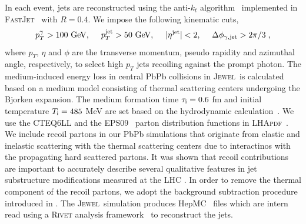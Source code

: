 \documentclass[notoc]{JHEP3}
\newcommand{\text}[1]{{\rm #1}}
\newcommand{\jw}{\textsc{Jewel}~}
\begin{document}
In each event, jets are reconstructed using the anti-$k_{t}$ algorithm~\cite{Cacciari:2008gp} implemented in \textsc{FastJet}~\cite{Cacciari:2011ma} with $R = 0.4$. We impose the following kinematic cuts,
\begin{equation}
    p^{\gamma}_T > 100~{\rm GeV}, ~~~~ p^{\rm jet}_T > 50~{\rm GeV}, ~~~~ |\eta^{\rm jet}|<2, ~~~~\Delta \phi_{\gamma, {\rm jet}} > 2\pi/3\;,
\end{equation}
where $p_T$, $\eta$ and $\phi$ are the transverse momentum, pseudo rapidity and azimuthal angle, respectively, to select high $p_T$ jets recoiling against the prompt photon. The medium-induced energy loss in central PbPb collisions in \jw is calculated based on a medium model consisting of thermal scattering centers undergoing the Bjorken expansion. The medium formation time $\tau_\text{i}=0.6 $ fm and initial temperature $T_\text{i}=485$ MeV are set based on the hydrodynamic calculation~\cite{Shen:2012vn,Shen:2014vra}. We use the \textsc{CTEQ6LL} \cite{Pumplin:2002vw} and the \textsc{EPS09}~\cite{Eskola:2009uj} parton distribution functions in \textsc{LHApdf}~\cite{Whalley:2005nh}. We include recoil partons in our PbPb simulations that originate from elastic and inelastic scattering with the thermal scattering centers due to interactinos with the propagating hard scattered partons. It was shown that recoil contributions are important to accurately describe several qualitative features in jet substructure modifications measured at the LHC \cite{KunnawalkamElayavalli:2017hxo,Milhano:2017nzm}. In order to remove the thermal component of the recoil partons, we adopt the background subtraction procedure introduced in \cite{KunnawalkamElayavalli:2017hxo}. The \jw simulation produces HepMC~\cite{} files which are intern read using a \textsc{Rivet} analysis framework~\cite{} to reconstruct the jets. 
\end{document}
